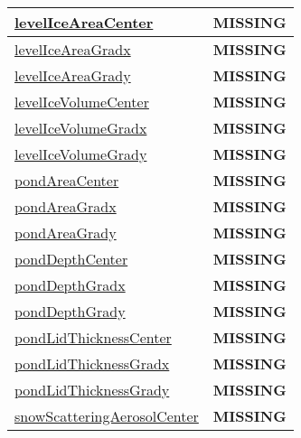 {\begin{center}
\begin{longtable}{| p{2.0in} | p{4.0in} |}
    \hline
    \hyperref[subsec:var_sec_tracer_reconstruction_levelIceAreaCenter]{levelIceAreaCenter} & {\bf \color{red} MISSING} \\
    \hline
    \hyperref[subsec:var_sec_tracer_reconstruction_levelIceAreaGradx]{levelIceAreaGradx} & {\bf \color{red} MISSING} \\
    \hline
    \hyperref[subsec:var_sec_tracer_reconstruction_levelIceAreaGrady]{levelIceAreaGrady} & {\bf \color{red} MISSING} \\
    \hline
    \hyperref[subsec:var_sec_tracer_reconstruction_levelIceVolumeCenter]{levelIceVolumeCenter} & {\bf \color{red} MISSING} \\
    \hline
    \hyperref[subsec:var_sec_tracer_reconstruction_levelIceVolumeGradx]{levelIceVolumeGradx} & {\bf \color{red} MISSING} \\
    \hline
    \hyperref[subsec:var_sec_tracer_reconstruction_levelIceVolumeGrady]{levelIceVolumeGrady} & {\bf \color{red} MISSING} \\
    \hline
    \hyperref[subsec:var_sec_tracer_reconstruction_pondAreaCenter]{pondAreaCenter} & {\bf \color{red} MISSING} \\
    \hline
    \hyperref[subsec:var_sec_tracer_reconstruction_pondAreaGradx]{pondAreaGradx} & {\bf \color{red} MISSING} \\
    \hline
    \hyperref[subsec:var_sec_tracer_reconstruction_pondAreaGrady]{pondAreaGrady} & {\bf \color{red} MISSING} \\
    \hline
    \hyperref[subsec:var_sec_tracer_reconstruction_pondDepthCenter]{pondDepthCenter} & {\bf \color{red} MISSING} \\
    \hline
    \hyperref[subsec:var_sec_tracer_reconstruction_pondDepthGradx]{pondDepthGradx} & {\bf \color{red} MISSING} \\
    \hline
    \hyperref[subsec:var_sec_tracer_reconstruction_pondDepthGrady]{pondDepthGrady} & {\bf \color{red} MISSING} \\
    \hline
    \hyperref[subsec:var_sec_tracer_reconstruction_pondLidThicknessCenter]{pondLidThicknessCenter} & {\bf \color{red} MISSING} \\
    \hline
    \hyperref[subsec:var_sec_tracer_reconstruction_pondLidThicknessGradx]{pondLidThicknessGradx} & {\bf \color{red} MISSING} \\
    \hline
    \hyperref[subsec:var_sec_tracer_reconstruction_pondLidThicknessGrady]{pondLidThicknessGrady} & {\bf \color{red} MISSING} \\
    \hline
    \hyperref[subsec:var_sec_tracer_reconstruction_snowScatteringAerosolCenter]{snowScatteringAerosolCenter} & {\bf \color{red} MISSING} \\

\end{longtable}
\end{center}}
